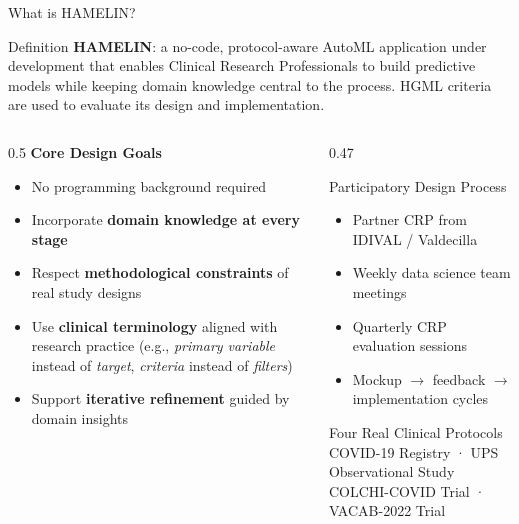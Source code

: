 \documentclass[aspectratio=169,10pt,english,dvipsnames]{beamer}
\begin{document}
\begin{frame}{What is HAMELIN?} \small  
  \begin{block}{Definition} \small  
    \textbf{HAMELIN}: a no-code, protocol-aware AutoML application under development that enables Clinical Research Professionals to build predictive models while keeping domain knowledge central to the process. HGML criteria are used to evaluate its design and implementation.
  \end{block}  
  \vspace{4mm}  
  
  \begin{columns}[T]  
    \begin{column}{0.5\textwidth} \small  
      \textbf{Core Design Goals}  
      \begin{itemize}  
        \item No programming background required  
        \item Incorporate \textbf{domain knowledge at every stage}  
        \item Respect \textbf{methodological constraints} of real study designs  
        \item Use \textbf{clinical terminology} aligned with research practice (e.g., \textit{primary variable} instead of \textit{target}, \textit{criteria} instead of \textit{filters})  
        \item Support \textbf{iterative refinement} guided by domain insights  
      \end{itemize}  
    \end{column}  
    \begin{column}{0.47\textwidth}  
      \begin{block}{Participatory Design Process}  
        \begin{itemize}\scriptsize  
          \item Partner CRP from IDIVAL / Valdecilla  
          \item Weekly data science team meetings  
          \item Quarterly CRP evaluation sessions  
          \item Mockup $\rightarrow$ feedback $\rightarrow$ implementation cycles  
        \end{itemize}  
      \end{block}  
      \vspace{2mm}  
      \begin{block}{Four Real Clinical Protocols}  
        \scriptsize  
        COVID-19 Registry · UPS Observational Study\\  
        COLCHI-COVID Trial · VACAB-2022 Trial  
      \end{block}  
    \end{column}  
  \end{columns}  
\end{frame}
\end{document}
